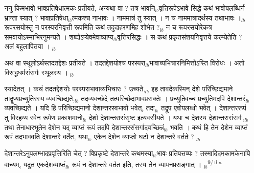 \documentclass[article,12pt,a4paper]{memoir}%
\newcounter{parCount}
\begin{document}
	  
	  \pstart \leavevmode%
	ननु किमभावो भावप्रतिषेधात्मकः प्रतीयते, अन्यथा वा ? तत्र भावनि{\tiny $_{lb}$}वृत्तिरूपे\leavevmode{}ऽभावे सिद्धे कथं भावोपलब्धिर्न भ्रान्ता स्यात् ? भावाप्रतिषेधा{\tiny $_{lb}$}त्मकश्च नाभावः । नाममात्रं तु स्यात् । न च नाममात्रादर्थस्य तथाभावः ।{\tiny $_{lb}$} रूपरसयोस्तु न परस्परनिवृत्ती रूपमिति कथं तदुदाहरणमिह शोभेत ?{\tiny $_{lb}$} न च रूपरसयोरेकत्र समवायोऽस्माभिरनुमन्यते । शब्दोऽप्येवमेवाव्याप्य{\tiny $_{lb}$}वृत्तिरसिद्धः । स कथं प्रकृतसंशयनिवृत्तये कल्प्येतेति ? अलं बहुलापितया ।
	{}
	\pend%
      {\tiny $_{lb}$}

	  
	  \pstart \leavevmode%
	अथ वा स्थूलोऽर्थस्तदतद्देशः प्रतीयते । तदतद्देशयोश्च परस्परा{\tiny $_{lb}$}भावाव्यभिचारनिमित्तोऽस्ति विरोधः । अतो विरुद्धधर्मसंसर्गः स्थूलस्य ।
	{}
	\pend%
      {\tiny $_{lb}$}

	  
	  \pstart \leavevmode%
	स्यादेतत् । कथं तदतद्देशयोः परस्पराभावाव्यभिचारः ? उच्यते,{\tiny $_{lb}$} इह तावदेकस्मिन् देशे परिच्छिद्यमाने ताद्रूप्यप्रच्युतिरस्य व्यवच्छिद्यते,{\tiny $_{lb}$} तदव्यवच्छेदे तत्परिच्छेदाभावप्रसक्तेः । प्रच्युतिवच्च प्रच्युतिमदपि देशान्तरं{\tiny $_{lb}$} व्यवच्छिद्यते । यदि हि परिच्छिद्यमानो देशान्तरस्वभावो भवेत्, तदा{\tiny $_{lb}$} तद्रूप एवोपलब्धो भवेत् । देशान्तररूपं तु विरहय्य स्वेन रूपेण प्रकाशमानो{\tiny $_{lb}$} देशो देशान्तरासंसृष्ट इत्यवसीयते । यथा च देशस्य देशान्तरासंसर्गः,{\tiny $_{lb}$} तथा तेनाधारभूतेन देशेन यद् व्याप्तं रूपं तदपि देशान्तरसंसर्गादवच्छिन्नं{\tiny $_{lb}$} भवति । कथं हि तेन देशेन व्याप्तं रूपं तदभाववति देशान्तरे वर्तेत, यथा{\tiny $_{lb}$} एकेन देशेन व्याप्तो घटो न देशान्तरे वर्तते ?
	{}
	\pend%
      {\tiny $_{lb}$}

	  
	  \pstart \leavevmode%
	देशान्तरेऽनुपलम्भादप्रवृत्तिरिति चेत् ? विप्रकृष्टे देशान्तरे कथमस्या{\tiny $_{lb}$}भावः प्रतिपत्तव्यः ? तस्मादिदमकामकेनापि वाच्यम्, यदुत एकदेशव्याप्तं{\tiny $_{lb}$} रूपं न देशान्तरे वर्तत इति, तस्य तेन व्यापनप्रसङ्गात् ।
	{}
	\pend%
      {\tiny $_{lb}$}\textsuperscript{\textenglish{9/tha}}
\end{document}
